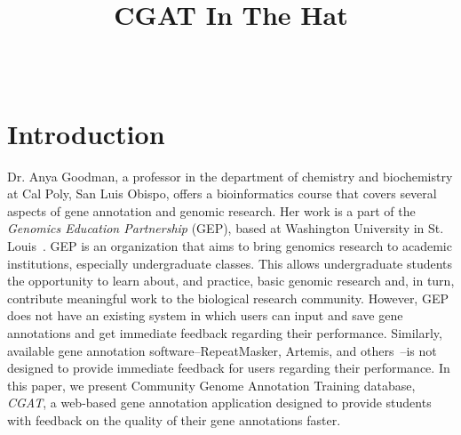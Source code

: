 \documentclass[10pt, conference, compsocconf]{IEEEtran}
\begin{document}
\title{CGAT In The Hat}


\author{
\\
}

\maketitle

\thispagestyle{empty}
\pagestyle{empty}

\section{Introduction}\label{sec:introduction}
Dr. Anya Goodman, a professor in the department of chemistry and biochemistry
at Cal Poly, San Luis Obispo, offers a bioinformatics course that covers
several aspects of gene annotation and genomic research. Her work is a part of
the \textit{Genomics Education Partnership} (GEP), based at Washington
University in St. Louis~\cite{gep}. GEP is an organization that aims to bring
genomics research to academic institutions, especially undergraduate classes.
This allows undergraduate students the opportunity to learn about, and
practice, basic genomic research and, in turn, contribute meaningful work to
the biological research community. However, GEP does not have an existing
system in which users can input and save gene annotations and get immediate
feedback regarding their performance. Similarly, available gene annotation
software--RepeatMasker, Artemis, and others~\cite{repeatmasker, artemis}--is
not designed to provide immediate feedback for users regarding their
performance. In this paper, we present Community Genome Annotation Training database,
\textit{CGAT}, a web-based gene annotation application designed to provide
students with feedback on the quality of their gene annotations faster.
\end{document}
